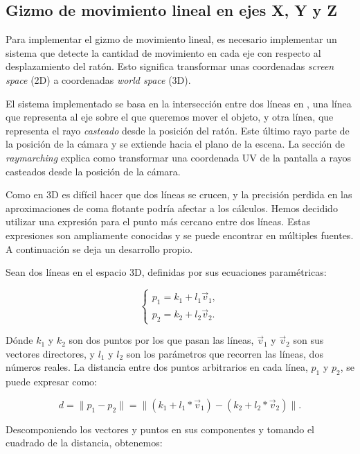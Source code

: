 \subsection{Gizmo de movimiento lineal en ejes X, Y y Z}

Para implementar el gizmo de movimiento lineal, es necesario implementar un
sistema que detecte la cantidad de movimiento en cada eje con respecto al
desplazamiento del ratón. Esto significa transformar unas coordenadas
\textit{screen space} (2D) a coordenadas \textit{world space} (3D).

El sistema implementado se basa en la intersección entre dos líneas en
, una línea que representa al eje sobre el que queremos mover
el objeto, y otra línea, que representa el rayo \textit{casteado} desde la
posición del ratón. Este último rayo parte de la posición de la cámara y se
extiende hacia el plano de la escena. La sección de \textit{raymarching}
explica como transformar una coordenada UV de la pantalla a rayos casteados
desde la posición de la cámara.

Como en 3D es difícil hacer que dos líneas se crucen, y la precisión perdida en
las aproximaciones de coma flotante podría afectar a los cálculos. Hemos
decidido utilizar una expresión para el punto más cercano entre dos líneas.
Estas expresiones son ampliamente conocidas y se puede encontrar en múltiples
fuentes. A continuación se deja un desarrollo propio.

Sean dos líneas en el espacio 3D, definidas por sus ecuaciones paramétricas:

\begin{equation}
    \begin{cases}
        p_1 = k_1 + l_1  \vec{v}_1, \\
        p_2 = k_2 + l_2  \vec{v}_2.
    \end{cases}
\end{equation}

Dónde $k_1$ y $k_2$ son dos puntos por los que pasan las líneas, $\vec{v}_1$ y
$\vec{v}_2$ son sus vectores directores, y $l_1$ y $l_2$ son los parámetros que
recorren las líneas, dos números reales. La distancia entre dos puntos
arbitrarios en cada línea, $p_1$ y $p_2$, se puede expresar como:

\begin{equation}
    d = \| p_1 - p_2 \| = \| (k_1 + l_1 * \vec{v}_1) - (k_2 + l_2 * \vec{v}_2) \|.
\end{equation}

Descomponiendo los vectores y puntos en sus componentes y tomando el cuadrado
de la distancia, obtenemos:

